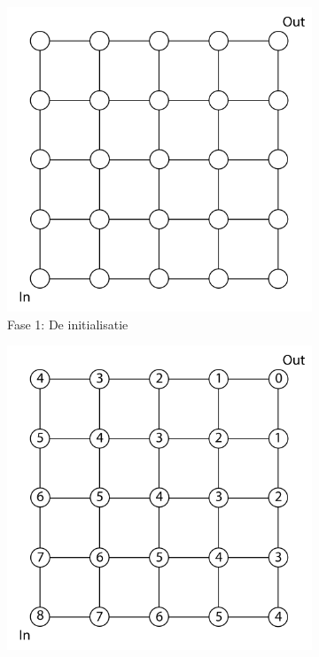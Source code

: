 \documentclass{report}
\begin{document}
\begin{figure}[H]
	\centering
	\begin{subfigure}{0.32\textwidth}
		\centering
		\includegraphics[width=\textwidth]{resource/grid.png}
		\caption{Fase 1: De initialisatie}
		\label{fig:lee-grid}
	\end{subfigure}
	\begin{subfigure}{0.32\textwidth}
		\centering
		\includegraphics[width=\textwidth]{resource/wave-expansion.png}

\end{subfigure}
\end{figure}
\end{document}

